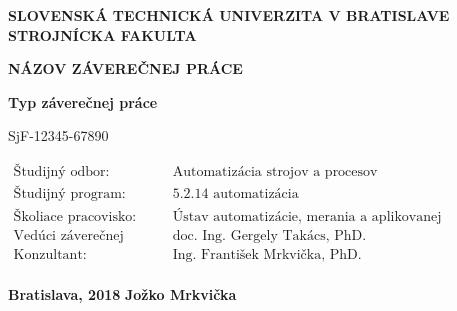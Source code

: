 \thispagestyle{empty}

\noindent \begin{center}
	\textbf{{\large{}SLOVENSKÁ TECHNICKÁ UNIVERZITA V BRATISLAVE}}\\
	\textbf{{\large{}STROJNÍCKA FAKULTA}}\textbf{\large{} }\\
	\vspace{3cm}
	\par\end{center}

\noindent \begin{center}
	\vspace{3cm}
	\par\end{center}



\begin{center}
	\textbf{\textsc{\Large{}NÁZOV ZÁVEREČNEJ PRÁCE}}\\
	\par\end{center}{\Large \par}

\begin{center}
	\textbf{\large{}Typ záverečnej práce}\\
	\par\end{center}{\large \par}

\begin{center}
	{\large{}SjF-12345-67890}\\
\end{center}


\vfill
\begin{flushleft}
	$\begin{array}{ll}
		\text{Študijný odbor:}&\text{Automatizácia strojov a procesov}\\
		\text{Študijný program:}&\text{5.2.14 automatizácia}\\
		\text{Školiace pracovisko:}&\text{Ústav automatizácie, merania a aplikovanej informatiky}\\
		\text{Vedúci záverečnej práce:}&\text{doc. Ing. Gergely Takács, PhD.}\\
		\text{Konzultant:}&\text{Ing. František Mrkvička, PhD.}\\
	\end{array}$
\end{flushleft}
\vspace{0.5cm}
\noindent \textbf{\large{}Bratislava, 2018} \hfill \textbf{\large{}Jožko Mrkvička}
\cleardoublepage